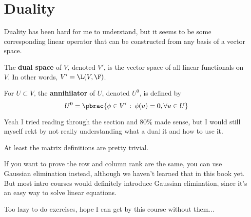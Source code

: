 \section{Duality}

Duality has been hard for me to understand, but it seems to be some corresponding linear operator that can be constructed from any basis of a vector space.

\begin{definition}
  The \textbf{dual space} of $V$, denoted $V'$, is the vector space of all linear functionals on $V$.
  In other words, $V' = \L(V, \F)$.
\end{definition}

\begin{definition}
  For $U \subset V$, the \textbf{annihilator} of $U$, denoted $U^0$, is defined by
  \begin{equation}
    U^0 = \pbrac{
      \phi \in V' \, :\, \phi(u) = 0, \forall u \in U
    }
  \end{equation}
\end{definition}

Yeah I tried reading through the section and 80\% made sense, but I would still myself rekt by not really understanding what a dual it and how to use it.

At least the matrix definitions are pretty trivial.

If you want to prove the row and column rank are the same, you can use Gaussian elimination instead, although we haven't learned that in this book yet.
But most intro courses would definitely introduce Gaussian elimination, since it's an easy way to solve linear equations.

Too lazy to do exercises, hope I can get by this course without them...